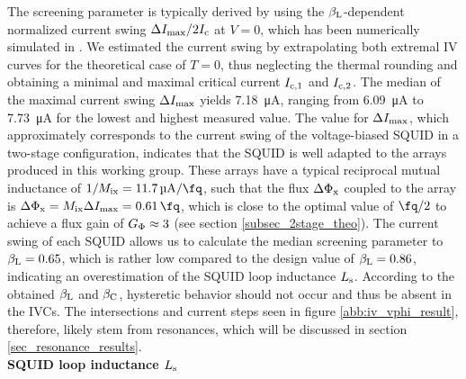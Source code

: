 The screening parameter is typically derived by using the $\beta_{\rm L}$-dependent normalized current swing $\Delta I_{\rm max}/2I_{\rm c}$ at $V=0$, which has been numerically simulated in \cite{Tesche1977}. We estimated the current swing by extrapolating both extremal IV curves for the theoretical case of $T=0$, thus neglecting the thermal rounding and obtaining a minimal and maximal critical current $I_{\rm c,1}$ and $I_{\rm c,2}$. %
The median of the maximal current swing $\Delta I_{\rm max}$ yields \qty{7.18}{\micro\ampere}, ranging from \qty{6.09}{\micro\ampere} to \qty{7.73}{\micro\ampere} for the lowest and highest measured value. The value for $\Delta I_{\rm max}$, which approximately corresponds to the current swing of the voltage-biased SQUID in a two-stage configuration, indicates that the SQUID is well adapted to the arrays produced in this working group. These arrays have a typical reciprocal mutual inductance of $1/M_{\rm ix}=\qty{11.7}{\micro\ampere\per\fq}$, such that the flux $\Delta\Phi_{\rm x}$ coupled to the array is $\Delta\Phi_{\rm x}=M_{\rm ix}\Delta I_{\rm max}=\qty{0.61}{\fq}$, which is close to the optimal value of $\unit{\fq}/2$ to achieve a flux gain of $G_{\rm \Phi}\approx 3$ (see section \ref{subsec_2stage_theo}). The current swing of each SQUID allows us to calculate the median screening parameter to $\beta_{\rm L}=0.65$, which is rather low compared to the design value of $\beta_{\rm L}=0.86$, indicating an overestimation of the SQUID loop inductance $L_{\rm s}$. According to the obtained $\beta_{\rm L}$ and $\beta_{\rm C}$, hysteretic behavior should not occur and thus be absent in the IVCs. The intersections and current steps seen in figure \ref{abb:iv_vphi_result}, therefore, likely stem from resonances, which will be discussed in section \ref{sec_resonance_results}. \\ 

{\large{\textbf{SQUID loop inductance $L_{\rm s}$}}}
\\

